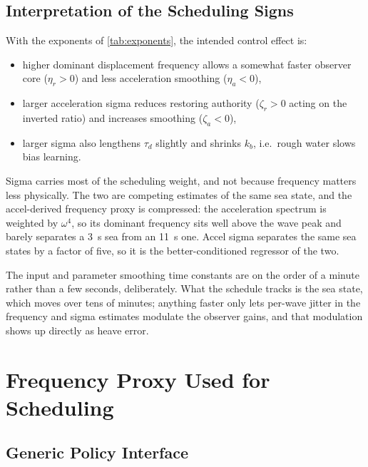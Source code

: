 \documentclass[conference]{IEEEtran}
\begin{document}
    

    \subsection{Interpretation of the Scheduling Signs}

    With the exponents of \cref{tab:exponents}, the intended control effect is:
    \begin{itemize}[leftmargin=1.4em]
        \item higher dominant displacement frequency allows a somewhat faster
        observer core (\(\eta_r>0\)) and less acceleration smoothing
        (\(\eta_a<0\)),
        \item larger acceleration sigma reduces restoring authority
        (\(\zeta_r>0\) acting on the inverted ratio) and increases smoothing
        (\(\zeta_a<0\)),
        \item larger sigma also lengthens \(\tau_d\) slightly and shrinks
        \(k_b\), i.e.\ rough water slows bias learning.
    \end{itemize}

    Sigma carries most of the scheduling weight, and not because frequency
    matters less physically. The two are competing estimates of the same sea
    state, and the accel-derived frequency proxy is compressed: the acceleration
    spectrum is weighted by \(\omega^4\), so its dominant frequency sits well
    above the wave peak and barely separates a \SI{3}{s} sea from an \SI{11}{s}
    one. Accel sigma separates the same sea states by a factor of five, so it is
    the better-conditioned regressor of the two.

    The input and parameter smoothing time constants are on the order of a
    minute rather than a few seconds, deliberately. What the schedule tracks is
    the sea state, which moves over tens of minutes; anything faster only lets
    per-wave jitter in the frequency and sigma estimates modulate the observer
    gains, and that modulation shows up directly as heave error.

    \section{Frequency Proxy Used for Scheduling}\label{sec:freq_proxy}

    \subsection{Generic Policy Interface}
\end{document}
